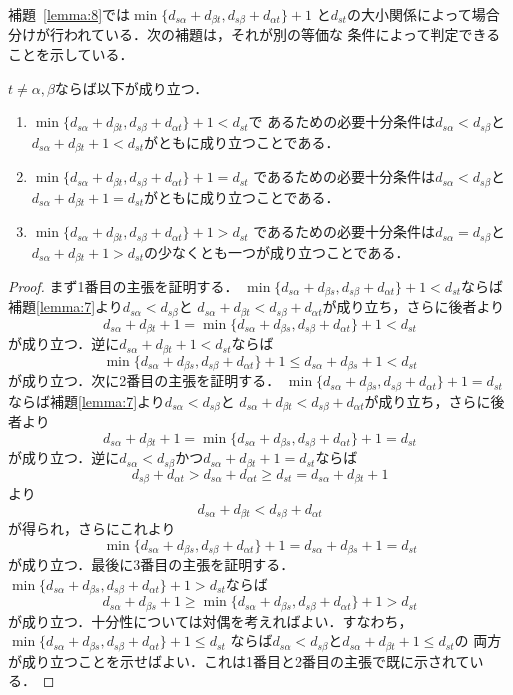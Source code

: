 補題~\ref{lemma:8}では$\min\{d_{s\alpha}+d_{\beta t}, d_{s\beta}+d_{\alpha t}\}+1$
と$d_{st}$の大小関係によって場合分けが行われている．次の補題は，それが別の等価な
条件によって判定できることを示している．

\begin{lemma}
\rm 
$t \neq \alpha, \beta$ならば以下が成り立つ．
\begin{enumerate}
\item $\min\{d_{s\alpha}+d_{\beta t}, d_{s\beta}+d_{\alpha t}\}+1<d_{st}$で
あるための必要十分条件は$d_{s\alpha} < d_{s\beta}$と
$d_{s\alpha}+d_{\beta t}+1<d_{st}$がともに成り立つことである．
\item $\min\{d_{s\alpha}+d_{\beta t}, d_{s\beta}+d_{\alpha t}\}+1=d_{st}$
であるための必要十分条件は$d_{s\alpha} < d_{s\beta}$と 
$d_{s\alpha}+d_{\beta t}+1=d_{st}$がともに成り立つことである．
\item $\min\{d_{s\alpha}+d_{\beta t}, d_{s\beta}+d_{\alpha t}\}+1>d_{st}$
であるための必要十分条件は$d_{s\alpha}=d_{s\beta}$と$d_{s\alpha}+d_{\beta t}+1>d_{st}$の少なくとも一つが成り立つことである．
\end{enumerate}
\label{lemma:8b}
\end{lemma}
\begin{proof}
まず1番目の主張を証明する．
$\min\{d_{s\alpha}+d_{\beta s}, d_{s\beta}+d_{\alpha t}\}+1<d_{st}$ならば補題\ref{lemma:7}より$d_{s\alpha}<d_{s\beta}$と
$d_{s\alpha}+d_{\beta t}<d_{s\beta}+d_{\alpha t}$が成り立ち，さらに後者より
\[
d_{s\alpha}+d_{\beta t}+1=
 \min\{d_{s\alpha}+d_{\beta s}, d_{s\beta}+d_{\alpha t}\}+1<d_{st}
\]
が成り立つ．逆に$d_{s\alpha}+d_{\beta t}+1<d_{st}$ならば
\[
 \min\{d_{s\alpha}+d_{\beta s}, d_{s\beta}+d_{\alpha t}\}+1 \leq 
d_{s\alpha}+d_{\beta s}+1<d_{st}
\]
が成り立つ．次に2番目の主張を証明する．
$\min\{d_{s\alpha}+d_{\beta s}, d_{s\beta}+d_{\alpha t}\}+1=d_{st}$ならば補題\ref{lemma:7}より$d_{s\alpha}<d_{s\beta}$と
$d_{s\alpha}+d_{\beta t}<d_{s\beta}+d_{\alpha t}$が成り立ち，さらに後者より
\[
d_{s\alpha}+d_{\beta t}+1=
 \min\{d_{s\alpha}+d_{\beta s}, d_{s\beta}+d_{\alpha t}\}+1=d_{st}
\]
が成り立つ．逆に$d_{s\alpha}<d_{s\beta}$かつ$d_{s\alpha}+d_{\beta t}+1=d_{st}$ならば
\[
d_{s\beta}+d_{\alpha t}>d_{s\alpha}+d_{\alpha t} \geq d_{st}
=d_{s\alpha}+d_{\beta t}+1
\]
より
\[
 d_{s\alpha}+d_{\beta t} < d_{s\beta}+d_{\alpha t}
\]
が得られ，さらにこれより
\[
\min\{d_{s\alpha}+d_{\beta s}, d_{s\beta}+d_{\alpha t}\}+1=
d_{s\alpha}+d_{\beta s}+1=d_{st}
\]
が成り立つ．最後に3番目の主張を証明する．
$\min\{d_{s\alpha}+d_{\beta s}, d_{s\beta}+d_{\alpha t}\}+1>d_{st}$ならば
\[
 d_{s\alpha}+d_{\beta s}+1 \geq 
\min\{d_{s\alpha}+d_{\beta s}, d_{s\beta}+d_{\alpha t}\}+1>d_{st}
\]
が成り立つ．十分性については対偶を考えればよい．すなわち，
$\min\{d_{s\alpha}+d_{\beta s}, d_{s\beta}+d_{\alpha t}\}+1 \leq d_{st}$
ならば$d_{s\alpha}<d_{s\beta}$と$d_{s\alpha}+d_{\beta t}+1\leq d_{st}$の
両方が成り立つことを示せばよい．これは1番目と2番目の主張で既に示されている．
\end{proof}

